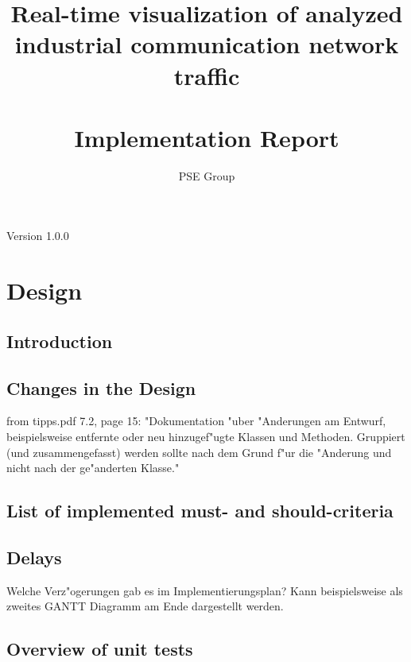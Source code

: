 \documentclass[oneside, english, final]{design}
\author{PSE Group}
\title{Real-time visualization of analyzed industrial communication network traffic\\ \hfill \\Implementation Report}
\begin{document}
\nocite{*}

\setpdf

\maketitle


\hfill

\begin{center}
	\large{Version 1.0.0}
\end{center}


\thispagestyle{empty}
\begin{abstract}
	\thispagestyle{empty}
\end{abstract}

\thispagestyle{empty}
\newpage
\thispagestyle{empty}
\tableofcontents
\cleardoublepage
\setcounter{page}{1}


\section{Design}\label{sec:intro}
\subsection{Introduction}
\subsection{Changes in the Design}
from tipps.pdf 7.2, page 15:
"Dokumentation "uber "Anderungen am Entwurf, beispielsweise entfernte oder neu hinzugef"ugte 
Klassen und Methoden. Gruppiert (und zusammengefasst) werden sollte nach dem Grund f"ur
die "Anderung und nicht nach der ge"anderten Klasse."

\subsection{List of implemented must- and should-criteria}
\subsection{Delays}
Welche Verz"ogerungen gab es im Implementierungsplan? Kann beispielsweise als zweites
GANTT Diagramm am Ende dargestellt werden.
\subsection{Overview of unit tests}
\end{document}
